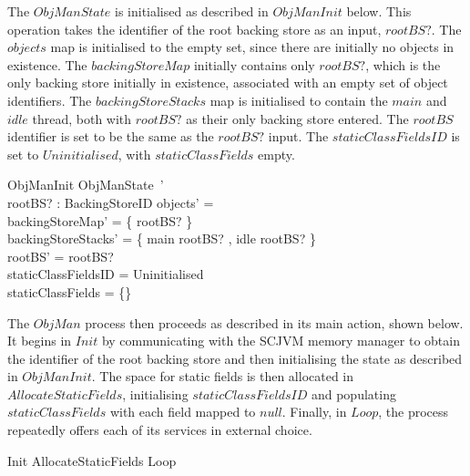 The $ObjManState$ is initialised as described in $ObjManInit$ below.
This operation takes the identifier of the root backing store as an
input, $rootBS?$.
The $objects$ map is initialised to the empty set, since there are
initially no objects in existence.
The $backingStoreMap$ initially contains only $rootBS?$, which is the
only backing store initially in existence, associated with an empty
set of object identifiers.
The $backingStoreStacks$ map is initialised to contain the $main$ and
$idle$ thread, both with $rootBS?$ as their only backing store
entered.
The $rootBS$ identifier is set to be the same as the $rootBS?$ input.
The $staticClassFieldsID$ is set to $Uninitialised$, with
$staticClassFields$ empty.
\begin{schema}{ObjManInit}
	ObjManState~' \\
	rootBS? : BackingStoreID
\where
	objects' = \emptyset \\
	backingStoreMap' = \{ rootBS? \mapsto \emptyset \} \\
	backingStoreStacks' = \{ main \mapsto \langle rootBS? \rangle, idle \mapsto \langle rootBS? \rangle \} \\
	rootBS' = rootBS? \\
	staticClassFieldsID = Uninitialised \\
	staticClassFields = \{\}
\end{schema}

The $ObjMan$ process then proceeds as described in its main action,
shown below.
It begins in $Init$ by communicating with the SCJVM memory manager to
obtain the identifier of the root backing store and then initialising
the state as described in $ObjManInit$.
The space for static fields is then allocated in
$AllocateStaticFields$, initialising $staticClassFieldsID$ and
populating $staticClassFields$ with each field mapped to $null$.
Finally, in $Loop$, the process repeatedly offers each of its services
in external choice.
\begin{circusaction}
  \circspot Init \circseq AllocateStaticFields \circseq Loop
\end{circusaction}

